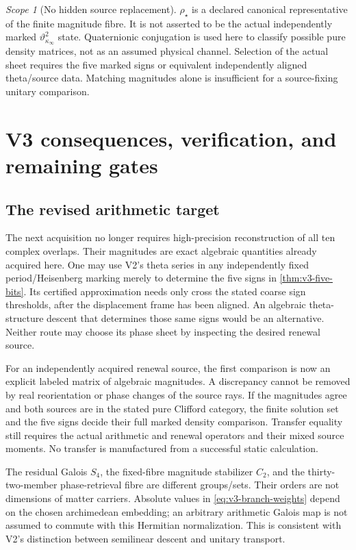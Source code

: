 \documentclass[11pt]{article}
\theoremstyle{definition}
\theoremstyle{remark}
\newtheorem{scope}[scope]{Scope}
\begin{document}
\begin{scope}[No hidden source replacement]
$\rho_\star$ is a declared canonical representative of the finite
magnitude fibre. It is not asserted to be the actual independently marked
$\vartheta_{\kappa_\infty}^2$ state. Quaternionic conjugation is used here
to classify possible pure density matrices, not as an assumed physical
channel. Selection of the actual sheet requires the five marked signs or
equivalent independently aligned theta/source data. Matching magnitudes
alone is insufficient for a source-fixing unitary comparison.
\end{scope}

\section{V3 consequences, verification, and remaining gates}
\label{sec:v3-status}

\subsection{The revised arithmetic target}
The next acquisition no longer requires high-precision reconstruction of
all ten complex overlaps. Their magnitudes are exact algebraic quantities
already acquired here. One may use V2's theta series in any independently
fixed period/Heisenberg marking merely to determine the five signs in
\cref{thm:v3-five-bits}. Its certified approximation needs only cross the
stated coarse sign thresholds, after the displacement frame has been aligned.
An algebraic theta-structure descent that determines those same signs would
be an alternative. Neither route may choose its phase sheet by inspecting
the desired renewal source.

For an independently acquired renewal source, the first comparison is now
an explicit labeled matrix of algebraic magnitudes. A discrepancy cannot be
removed by real reorientation or phase changes of the source rays. If the
magnitudes agree and both sources are in the stated pure Clifford category,
the finite solution set and the five signs decide their full marked density
comparison. Transfer equality still requires the actual arithmetic and
renewal operators and their mixed source moments. No transfer is manufactured
from a successful static calculation.

The residual Galois $S_4$, the fixed-fibre magnitude stabilizer $C_2$, and
the thirty-two-member phase-retrieval fibre are different groups/sets. Their
orders are not dimensions of matter carriers. Absolute values in
\eqref{eq:v3-branch-weights} depend on the chosen archimedean embedding;
an arbitrary arithmetic Galois map is not assumed to commute with this
Hermitian normalization. This is consistent with V2's distinction between
semilinear descent and unitary transport.
\end{document}
